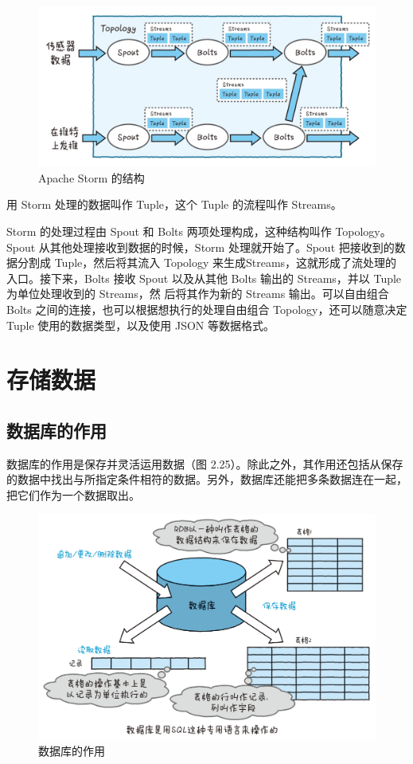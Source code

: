 \documentclass[12pt,UTF8]{ctexbook}
\begin{document}
\begin{figure}[htbp]
	\centering
	\includegraphics[width=1\linewidth]{43}
	\caption{Apache Storm 的结构}
	\label{fig:1}
\end{figure}

用 Storm 处理的数据叫作 Tuple，这个 Tuple 的流程叫作 Streams。

Storm 的处理过程由 Spout 和 Bolts 两项处理构成，这种结构叫作 Topology。Spout 从其他处理接收到数据的时候，Storm 处理就开始了。Spout 把接收到的数据分割成 Tuple，然后将其流入 Topology 来生成Streams，这就形成了流处理的入口。接下来，Bolts 接收 Spout 以及从其他 Bolts 输出的 Streams，并以 Tuple 为单位处理收到的 Streams，然
后将其作为新的 Streams 输出。可以自由组合 Bolts 之间的连接，也可以根据想执行的处理自由组合 Topology，还可以随意决定 Tuple 使用的数据类型，以及使用 JSON 等数据格式。

\section{存储数据}

\subsection{数据库的作用}

数据库的作用是保存并灵活运用数据（图 2.25）。除此之外，其作用还包括从保存的数据中找出与所指定条件相符的数据。另外，数据库还能把多条数据连在一起，把它们作为一个数据取出。

\begin{figure}[htbp]
	\centering
	\includegraphics[width=1\linewidth]{44}
	\caption{数据库的作用}
	\label{fig:1}
\end{figure}
\end{document}
